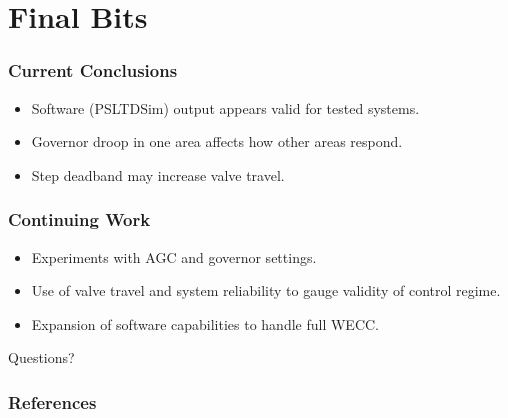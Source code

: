 \documentclass[14pt, unknownkeysallowed]{beamer}
\begin{document}
\section{Final Bits}
\begin{frame}
\frametitle{Current Conclusions}
\begin{itemize}
	\item Software (PSLTDSim) output appears valid for tested systems.
	\item Governor droop in one area affects how other areas respond.
	\item Step deadband may increase valve travel.
\end{itemize}
\end{frame}
\begin{frame}
\frametitle{Continuing Work}
\begin{itemize}
\item Experiments with AGC and governor settings.
\item Use of valve travel and system reliability to gauge validity of control regime.
\item Expansion of software capabilities to handle full WECC.
\end{itemize}
\end{frame}

\begin{frame}
\begin{center}
\Huge{Questions?}
\end{center}
\end{frame}

\begin{frame}[allowframebreaks]
\frametitle{References}
\renewcommand*{\bibfont}{\scriptsize} %
\printbibliography
\end{frame}
\end{document}
